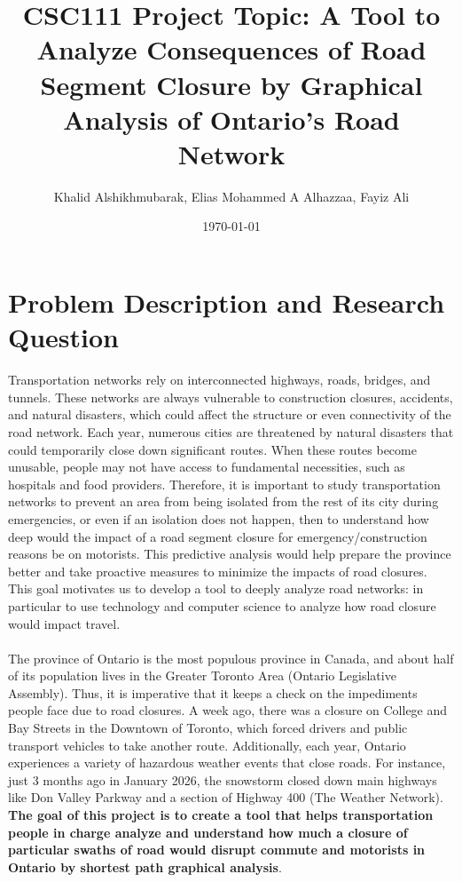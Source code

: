 \documentclass[fontsize=11pt]{article}
\title{CSC111 Project Topic:  A Tool to Analyze Consequences of Road Segment Closure by Graphical Analysis of Ontario's Road Network}
\author{Khalid Alshikhmubarak, Elias Mohammed A Alhazzaa, Fayiz Ali}
\date{\today}
\begin{document}
\maketitle

\section*{Problem Description and Research Question}
\par
Transportation networks rely on interconnected highways, roads, bridges, and tunnels. These networks are always vulnerable to construction closures, accidents, and natural disasters, which could affect the structure or even connectivity of the road network. Each year, numerous cities are threatened by natural disasters that could temporarily close down significant routes. When these routes become unusable, people may not have access to fundamental necessities, such as hospitals and food providers. Therefore, it is important to study transportation networks to prevent an area from being isolated from the rest of its city during emergencies, or even if an isolation does not happen, then to understand how deep would the impact of a road segment closure for emergency/construction reasons be on motorists. This predictive analysis would help prepare the province better and take proactive measures to minimize the impacts of road closures. This goal motivates us to develop a tool to deeply analyze road networks: in particular to use technology and computer science to analyze how road closure would impact travel.
\\\\
The province of Ontario is the most populous province in Canada, and about half of its population lives in the Greater Toronto Area (Ontario Legislative Assembly). Thus, it is imperative that it keeps a check on the impediments people face due to road closures. A week ago, there was a closure on College and Bay Streets in the Downtown of Toronto, which forced drivers and public transport vehicles to take another route. Additionally, each year, Ontario experiences a variety of hazardous weather events that close roads. For instance, just 3 months ago in January 2026, the snowstorm closed down main highways like Don Valley Parkway and a section of Highway 400 (The Weather  Network). \textbf{The goal of this project is to create a tool that helps transportation people in charge analyze and understand how much a closure of particular swaths of road would disrupt commute and motorists in Ontario by shortest path graphical analysis}.
\end{document}
